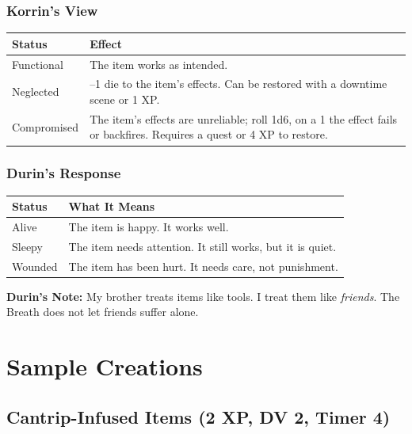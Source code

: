 \documentclass[11pt]{book}
\begin{document}
\subsection*{Korrin's View}

\begin{table}[h]
\centering
\begin{tabular}{@{}ll@{}}
\toprule
\textbf{Status} & \textbf{Effect} \\
\midrule
Functional & The item works as intended. \\
Neglected & --1 die to the item's effects. Can be restored with a downtime scene or 1 XP. \\
Compromised & The item's effects are unreliable; roll 1d6, on a 1 the effect fails or backfires. Requires a quest or 4 XP to restore. \\
\bottomrule
\end{tabular}
\end{table}

\subsection*{Durin's Response}

\begin{table}[h]
\centering
\begin{tabular}{@{}ll@{}}
\toprule
\textbf{Status} & \textbf{What It Means} \\
\midrule
Alive & The item is happy. It works well. \\
Sleepy & The item needs attention. It still works, but it is quiet. \\
Wounded & The item has been hurt. It needs care, not punishment. \\
\bottomrule
\end{tabular}
\end{table}

\vspace{0.5cm}
\textbf{Durin's Note:} My brother treats items like tools. I treat them like \textit{friends}. The Breath does not let friends suffer alone.

\newpage
\chapter{Sample Creations}

\section{Cantrip-Infused Items (2 XP, DV 2, Timer 4)}
\end{document}
